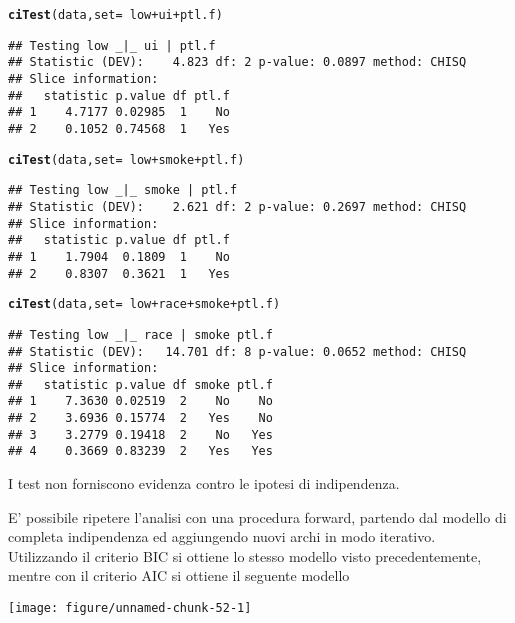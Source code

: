 \documentclass{article}\usepackage[]{graphicx}\usepackage[]{color}
\makeatletter
\def\maxwidth{ %
  \ifdim\Gin@nat@width>\linewidth
    \linewidth
  \else
    \Gin@nat@width
  \fi
}
\newcommand{\hlopt}[1]{\textcolor[rgb]{0,0,0}{#1}}%
\newcommand{\hlstd}[1]{\textcolor[rgb]{0.345,0.345,0.345}{#1}}%
\newcommand{\hlkwc}[1]{\textcolor[rgb]{0.333,0.667,0.333}{#1}}%
\newcommand{\hlkwd}[1]{\textcolor[rgb]{0.737,0.353,0.396}{\textbf{#1}}}%
\newenvironment{kframe}{%
 \def\at@end@of@kframe{}%
 \ifinner\ifhmode%
  \def\at@end@of@kframe{\end{minipage}}%
  \begin{minipage}{\columnwidth}%
 \fi\fi%
 \def\FrameCommand##1{\hskip\@totalleftmargin \hskip-\fboxsep
 \colorbox{shadecolor}{##1}\hskip-\fboxsep
     \hskip-\linewidth \hskip-\@totalleftmargin \hskip\columnwidth}%
 \MakeFramed {\advance\hsize-\width
   \@totalleftmargin\z@ \linewidth\hsize
   \@setminipage}}%
 {\par\unskip\endMakeFramed%
 \at@end@of@kframe}
\newenvironment{knitrout}{}{} %
\makeatother
\begin{document}
\begin{knitrout}
\color{fgcolor}\begin{kframe}
\begin{alltt}
\hlkwd{ciTest}\hlstd{(data,}\hlkwc{set}\hlstd{=}\hlopt{~}\hlstd{low} \hlopt{+} \hlstd{ui} \hlopt{+}\hlstd{ptl.f)}
\end{alltt}
\begin{verbatim}
## Testing low _|_ ui | ptl.f 
## Statistic (DEV):    4.823 df: 2 p-value: 0.0897 method: CHISQ
## Slice information:
##   statistic p.value df ptl.f
## 1    4.7177 0.02985  1    No
## 2    0.1052 0.74568  1   Yes
\end{verbatim}
\begin{alltt}
\hlkwd{ciTest}\hlstd{(data,}\hlkwc{set}\hlstd{=}\hlopt{~}\hlstd{low} \hlopt{+} \hlstd{smoke} \hlopt{+}\hlstd{ptl.f)}
\end{alltt}
\begin{verbatim}
## Testing low _|_ smoke | ptl.f 
## Statistic (DEV):    2.621 df: 2 p-value: 0.2697 method: CHISQ
## Slice information:
##   statistic p.value df ptl.f
## 1    1.7904  0.1809  1    No
## 2    0.8307  0.3621  1   Yes
\end{verbatim}
\begin{alltt}
\hlkwd{ciTest}\hlstd{(data,}\hlkwc{set}\hlstd{=}\hlopt{~}\hlstd{low} \hlopt{+} \hlstd{race} \hlopt{+}  \hlstd{smoke} \hlopt{+} \hlstd{ptl.f)}
\end{alltt}
\begin{verbatim}
## Testing low _|_ race | smoke ptl.f 
## Statistic (DEV):   14.701 df: 8 p-value: 0.0652 method: CHISQ
## Slice information:
##   statistic p.value df smoke ptl.f
## 1    7.3630 0.02519  2    No    No
## 2    3.6936 0.15774  2   Yes    No
## 3    3.2779 0.19418  2    No   Yes
## 4    0.3669 0.83239  2   Yes   Yes
\end{verbatim}
\end{kframe}
\end{knitrout}

I test non forniscono evidenza contro le ipotesi di indipendenza.

E' possibile ripetere l'analisi con una procedura forward, partendo dal modello di completa indipendenza ed aggiungendo nuovi archi in modo iterativo.\\
Utilizzando il criterio BIC si ottiene lo stesso modello visto precedentemente, mentre con il criterio AIC si ottiene il seguente modello

\begin{knitrout}
\color{fgcolor}
\texttt{[image: figure/unnamed-chunk-52-1]} 
\end{knitrout}
\end{document}
